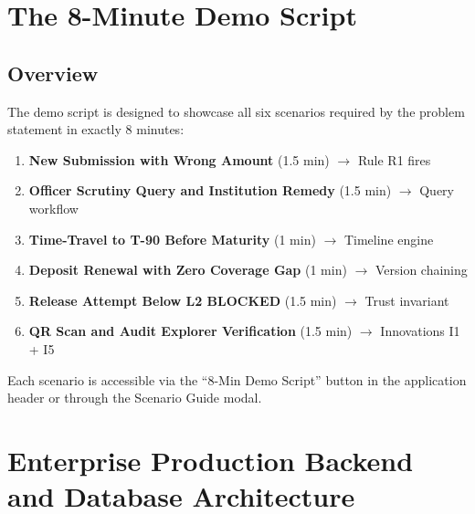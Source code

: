\documentclass[12pt, a4paper]{report}
\begin{document}
\chapter{The 8-Minute Demo Script}

\section{Overview}

The demo script is designed to showcase all six scenarios required by the problem statement in exactly 8 minutes:

\begin{enumerate}[label=\textbf{Scenario \arabic*:}, leftmargin=4em]
  \item \textbf{New Submission with Wrong Amount} (1.5 min) $\rightarrow$ Rule R1 fires
  \item \textbf{Officer Scrutiny Query and Institution Remedy} (1.5 min) $\rightarrow$ Query workflow
  \item \textbf{Time-Travel to T-90 Before Maturity} (1 min) $\rightarrow$ Timeline engine
  \item \textbf{Deposit Renewal with Zero Coverage Gap} (1 min) $\rightarrow$ Version chaining
  \item \textbf{Release Attempt Below L2 BLOCKED} (1.5 min) $\rightarrow$ Trust invariant
  \item \textbf{QR Scan and Audit Explorer Verification} (1.5 min) $\rightarrow$ Innovations I1 + I5
\end{enumerate}

Each scenario is accessible via the ``8-Min Demo Script'' button in the application header or through the Scenario Guide modal.



\chapter{Enterprise Production Backend and Database Architecture}
\end{document}
